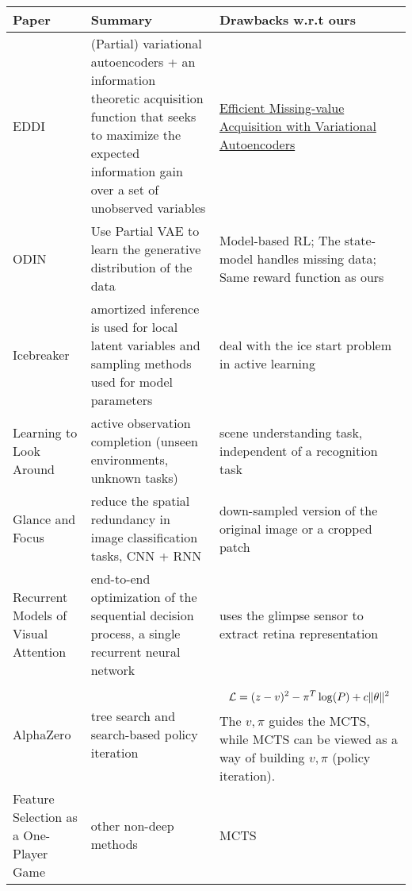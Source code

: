 \begin{center}
\begin{longtable}{| m{4cm} | m{5cm} | m{5cm} | }
\hline
\textbf{Paper} & \textbf{Summary} & \textbf{Drawbacks w.r.t ours}\\
\hline
\hline
EDDI \citep{ma_eddi_2019} & (Partial) variational autoencoders + an information theoretic acquisition function that seeks to maximize the expected information gain over a set of unobserved variables & \href{https://slideslive.com/38931299/efficient-missingvalue-acquisition-with-variational-autoencoders?ref=account-folder-55866-folders}{Efficient Missing-value Acquisition with Variational Autoencoders} \\
\hline
ODIN \citep{zannone_odin_2019} & Use Partial VAE to learn the generative distribution of the data & Model-based RL; The state-model handles missing data; Same reward function as ours\\
\hline
Icebreaker \citep{gong_icebreaker_2019} & amortized inference is used for local latent variables and sampling methods used for model parameters & deal with the ice start problem in active learning \\
\hline
\hline
Learning to Look Around \citep{jayaraman_learning_2018} & active observation completion (unseen environments, unknown tasks) &  scene understanding task, independent of a recognition task\\
\hline
Glance and Focus \citep{wang_glance_2020} & reduce the spatial redundancy in image classification tasks, CNN + RNN & down-sampled version of the original image or a cropped patch\\
\hline
Recurrent Models of Visual Attention \citep{mnih_recurrent_2014} & end-to-end optimization of the sequential decision process,  a single recurrent neural network & uses the glimpse sensor to extract retina representation\\
\hline
\hline
AlphaZero \citep{silver_general_2018} & tree search and search-based policy iteration & 
	\begin{align}
	   \mathcal{L} = (z-v)^2 - \pi^T\log(P) + c\|\theta\|^2
	\end{align}
	The $v, \pi$ guides the MCTS, while MCTS can be viewed as a way of building $v, \pi$ (policy iteration). \\
\hline
\hline
Feature Selection as a One-Player Game \citep{gaudel_feature_2010} & other non-deep methods & MCTS \\
\hline
\end{longtable}
\end{center}


